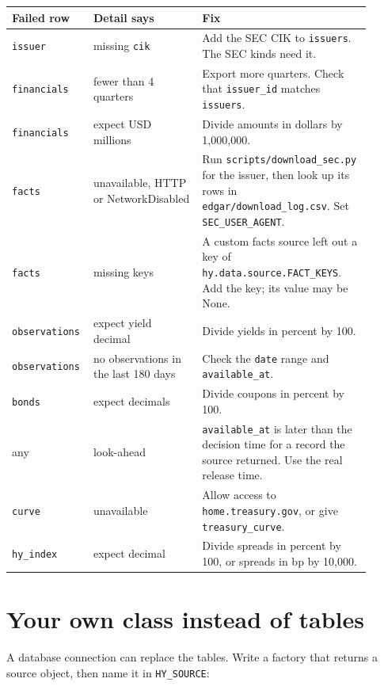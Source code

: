 \documentclass[10.5pt,a4paper]{article}
\newcommand{\code}[1]{\texttt{\small #1}}
\begin{document}
\begin{longtable}{@{}>{\raggedright\arraybackslash}p{0.153\linewidth}>{\raggedright\arraybackslash}p{0.297\linewidth}>{\raggedright\arraybackslash}p{0.450\linewidth}@{}}
\toprule
\textbf{Failed row} & \textbf{Detail says} & \textbf{Fix}\\
\midrule
\endhead
\code{issuer} & missing \code{cik} & Add the SEC CIK to \code{issuers}. The SEC kinds need it.\\
\code{financials} & fewer than 4 quarters & Export more quarters. Check that \code{issuer\_\allowbreak{}id} matches \code{issuers}.\\
\code{financials} & expect USD millions & Divide amounts in dollars by 1,000,000.\\
\code{facts} & unavailable, HTTP or NetworkDisabled & Run \code{scripts/\allowbreak{}download\_\allowbreak{}sec.py} for the issuer, then look up its rows in \code{edgar/\allowbreak{}download\_\allowbreak{}log.csv}. Set \code{SEC\_\allowbreak{}USER\_\allowbreak{}AGENT}.\\
\code{facts} & missing keys & A custom facts source left out a key of \code{hy.data.source.FACT\_\allowbreak{}KEYS}. Add the key; its value may be None.\\
\code{observations} & expect yield decimal & Divide yields in percent by 100.\\
\code{observations} & no observations in the last 180 days & Check the \code{date} range and \code{available\_\allowbreak{}at}.\\
\code{bonds} & expect decimals & Divide coupons in percent by 100.\\
any & look-ahead & \code{available\_\allowbreak{}at} is later than the decision time for a record the source returned. Use the real release time.\\
\code{curve} & unavailable & Allow access to \code{home.treasury.gov}, or give \code{treasury\_\allowbreak{}curve}.\\
\code{hy\_\allowbreak{}index} & expect decimal & Divide spreads in percent by 100, or spreads in bp by 10,000.\\
\bottomrule
\end{longtable}

\section{Your own class instead of tables}

A database connection can replace the tables. Write a factory that returns a source object, then name it in \code{HY\_\allowbreak{}SOURCE}:
\end{document}
